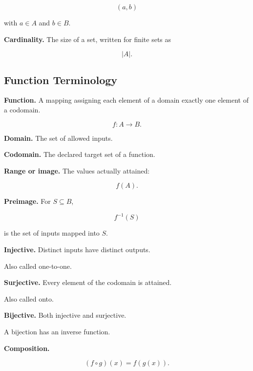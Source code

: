 \[
(a,b)
\]

with \(a\in A\) and \(b\in B\).

\medskip

\textbf{Cardinality.}
The size of a set, written for finite sets as

\[
\boxed{
|A|.
}
\]

\subsection{Function Terminology}
\label{subsec:function-terminology-reference}

\textbf{Function.}
A mapping assigning each element of a domain exactly one element of a
codomain.

\[
\boxed{
f:A\to B.
}
\]

\medskip

\textbf{Domain.}
The set of allowed inputs.

\medskip

\textbf{Codomain.}
The declared target set of a function.

\medskip

\textbf{Range or image.}
The values actually attained:

\[
\boxed{
f(A).
}
\]

\medskip

\textbf{Preimage.}
For \(S\subseteq B\),

\[
\boxed{
f^{-1}(S)
}
\]

is the set of inputs mapped into \(S\).

\medskip

\textbf{Injective.}
Distinct inputs have distinct outputs.

Also called one-to-one.

\medskip

\textbf{Surjective.}
Every element of the codomain is attained.

Also called onto.

\medskip

\textbf{Bijective.}
Both injective and surjective.

A bijection has an inverse function.

\medskip

\textbf{Composition.}

\[
\boxed{
(f\circ g)(x)
=
f(g(x)).
}
\]

\medskip

